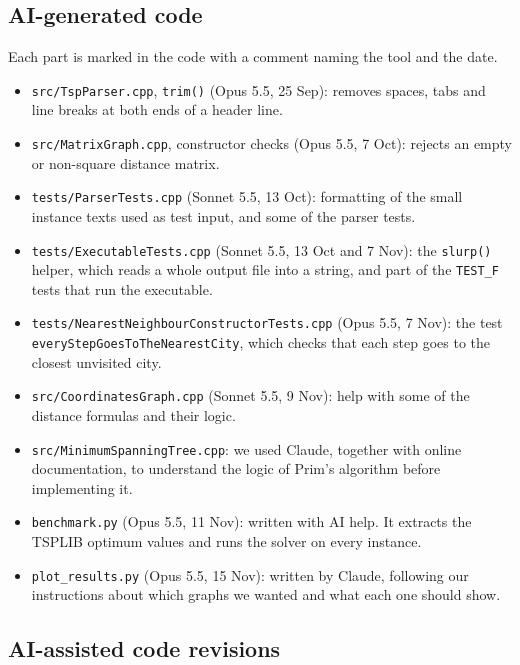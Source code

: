 \documentclass[10pt,a4paper]{article}
\begin{document}
\subsection*{AI-generated code}
Each part is marked in the code with a comment naming the tool and the date.
\begin{itemize}
  \item \texttt{src/TspParser.cpp}, \texttt{trim()} (Opus 5.5, 25 Sep): removes spaces, tabs and line breaks at both ends of a header line.

    \item \texttt{src/MatrixGraph.cpp}, constructor checks (Opus 5.5, 7 Oct): rejects an empty or non-square distance matrix.

    \item \texttt{tests/ParserTests.cpp} (Sonnet 5.5, 13 Oct): formatting of the small instance texts used as test input, and some of the parser tests.

    \item \texttt{tests/ExecutableTests.cpp} (Sonnet 5.5, 13 Oct and 7 Nov): the \texttt{slurp()} helper, which reads a whole output file into a string, and part of the \texttt{TEST\_F} tests that run the executable.

    \item \texttt{tests/NearestNeighbourConstructorTests.cpp} (Opus 5.5, 7 Nov): the test \\\texttt{everyStepGoesToTheNearestCity}, which checks that each step goes to the closest unvisited city.

    \item \texttt{src/CoordinatesGraph.cpp} (Sonnet 5.5, 9 Nov): help with some of the distance formulas and their logic.

    \item \texttt{src/MinimumSpanningTree.cpp}: we used Claude, together with online documentation, to understand the logic of Prim's algorithm before implementing it.

    \item \texttt{benchmark.py} (Opus 5.5, 11 Nov): written with AI help. It extracts the TSPLIB optimum values and runs the solver on every instance.

    \item \texttt{plot\_results.py} (Opus 5.5, 15 Nov): written by Claude, following our instructions about which graphs we wanted and what each one should show.
\end{itemize}

\subsection*{AI-assisted code revisions}
\end{document}
